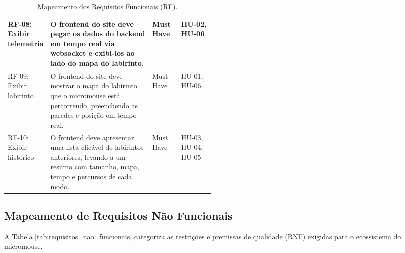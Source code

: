 \begin{table}[H]
\begin{tabularx}{\linewidth}{|>{\raggedright\arraybackslash}p{0.18\linewidth}|X|>{\centering\arraybackslash}p{0.14\linewidth}|>{\centering\arraybackslash}p{0.16\linewidth}|}
        RF-08: Exibir telemetria & O frontend do site deve pegar os dados do backend em tempo real via websocket e exibi-los ao lado do mapa do labirinto. & Must Have & HU-02, HU-06 \\ \hline
        
        RF-09: Exibir labirinto & O frontend do site deve mostrar o mapa do labirinto que o micromouse está percorrendo, preenchendo as paredes e posição em tempo real. & Must Have & HU-01, HU-06 \\ \hline
        
        RF-10: Exibir histórico & O frontend deve apresentar uma lista clicável de labirintos anteriores, levando a um resumo com tamanho, mapa, tempo e percursos de cada modo. & Must Have & HU-03, HU-04, HU-05 \\ \hline
    \end{tabularx}
    \caption{Mapeamento dos Requisitos Funcionais (RF).}
    \label{tab:requisitos_funcionais}
\end{table}

\subsection*{Mapeamento de Requisitos Não Funcionais}

A Tabela \ref{tab:requisitos_nao_funcionais} categoriza as restrições e premissas de qualidade (RNF) exigidas para o ecossistema do micromouse.


